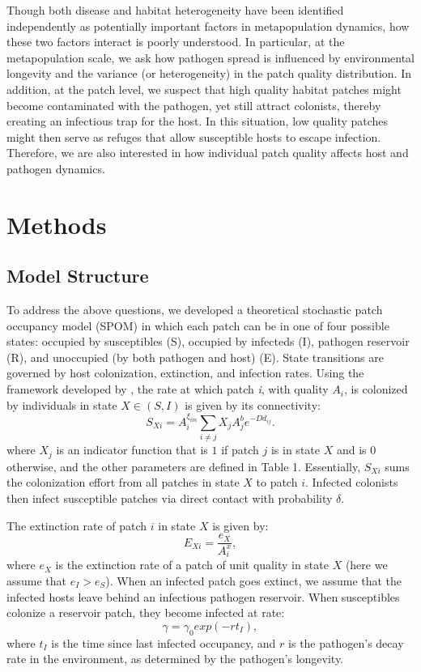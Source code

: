 \documentclass{svjour3}
\begin{document}
Though both disease and habitat heterogeneity have been identified independently as potentially important factors in metapopulation dynamics, how these two factors interact is poorly understood.  In particular, at the metapopulation scale, we ask how pathogen spread is influenced by environmental longevity and the variance (or heterogeneity) in the patch quality distribution.  In addition, at the patch level, we suspect that high quality habitat patches might become contaminated with the pathogen, yet still attract colonists, thereby creating an infectious trap for the host.  In this situation, low quality patches might then serve as refuges that allow susceptible hosts to escape infection.  Therefore, we are also interested in how individual patch quality affects host and pathogen dynamics.

\section{Methods}
\label{methods}

\subsection{Model Structure}
To address the above questions, we developed a theoretical stochastic patch occupancy model (SPOM) in which each patch can be in one of four possible states: occupied by susceptibles (S), occupied by infecteds (I), pathogen reservoir (R), and unoccupied (by both pathogen and host) (E).  State transitions are governed by host colonization, extinction, and infection rates.  Using the framework developed by \cite{Hanski1994}, the rate at which patch \emph{i}, with quality $A_i$, is colonized by individuals in state $X \in (S,I)$ is given by its connectivity:
\begin{equation}
S_{Xi}=A_i^{\xi_{im}} \sum_{i\neq j }X_jA_j^be^{-D d_{ij}}.
\end{equation}
where $X_j$ is an indicator function that is $1$ if patch $j$ is in state $X$ and is $0$ otherwise, and the other parameters are defined in Table 1.  Essentially, $S_{Xi}$ sums the colonization effort from all patches in state $X$ to patch $i$.  Infected colonists then infect susceptible patches via direct contact with probability $\delta$.  

The extinction rate of patch $i$ in state $X$ is given by:
\begin{equation}
E_{Xi}=\frac{e_X}{A_i^x},
\end{equation}
where $e_X$ is the extinction rate of a patch of unit quality in state $X$ (here we assume that $e_I>e_S$).  When an infected patch goes extinct, we assume that the infected hosts leave behind an infectious pathogen reservoir.  When susceptibles  colonize a reservoir patch, they become infected at rate:
\begin{equation}
\gamma=\gamma_0exp(-rt_I),
\end{equation}
where $t_I$ is the time since last infected occupancy, and $r$ is the pathogen's decay rate in the environment, as determined by the pathogen's longevity.
\end{document}
